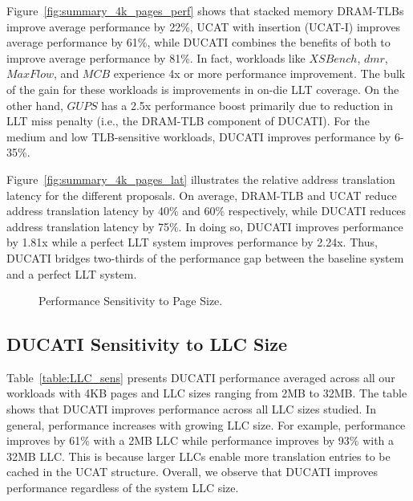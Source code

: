 Figure~\ref{fig:summary_4k_pages_perf} shows that stacked memory
DRAM-TLBs improve average performance by 22\%, UCAT with insertion
(UCAT-I) improves average performance by 61\%, while DUCATI combines
the benefits of both to improve average performance by 81\%. In fact,
workloads like $XSBench$, $dmr$, $MaxFlow$, and $MCB$ experience 4x or
more performance improvement. The bulk of the gain for these workloads
is improvements in on-die LLT coverage. On the other hand, $GUPS$ has
a 2.5x performance boost primarily due to reduction in LLT miss
penalty (i.e., the DRAM-TLB component of DUCATI). For the medium and
low TLB-sensitive workloads, DUCATI improves performance by 6-35\%.

Figure~\ref{fig:summary_4k_pages_lat} illustrates the relative address
translation latency for the different proposals. On average, DRAM-TLB
and UCAT reduce address translation latency by 40\% and 60\%
respectively, while DUCATI reduces address translation latency by
75\%. In doing so, DUCATI improves performance by 1.81x while a
perfect LLT system improves performance by 2.24x. Thus, DUCATI bridges
two-thirds of the performance gap between the baseline system and a
perfect LLT system.

\begin{figure}[b] 
\vspace{0.2 in} \centering
\centerline{}

\caption{\small Performance Sensitivity to Page Size. \normalsize}

\label{fig:summary_pagesize} 
\vspace{-0. in}
\end{figure}



\subsection{DUCATI Sensitivity to LLC Size}

\noindent Table~\ref{table:LLC_sens} presents DUCATI performance
averaged across all our workloads with 4KB pages and LLC sizes ranging
from 2MB to 32MB. The table shows that DUCATI improves performance
across all LLC sizes studied. In general, performance increases with
growing LLC size. For example, performance improves by 61\% with a 2MB
LLC while performance improves by 93\% with a 32MB LLC. This is
because larger LLCs enable more translation entries to be cached in
the UCAT structure. Overall, we observe that DUCATI improves
performance regardless of the system LLC size.

